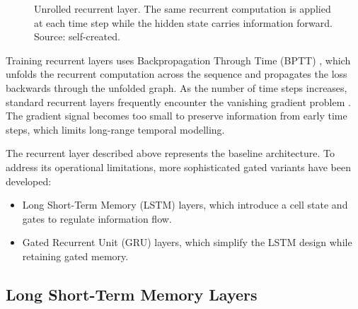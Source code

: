 \begin{figure}[H]
    \centering
    \caption{Unrolled recurrent layer. The same recurrent computation is applied at each time step while the hidden state carries information forward. Source: self-created.}
    \label{fig:rnn_unrolled}
\end{figure}

Training recurrent layers uses Backpropagation Through Time (BPTT) \cite{werbos1990bptt}, which
unfolds the recurrent computation across the sequence and propagates the loss backwards through the
unfolded graph. As the number of time steps increases, standard recurrent layers frequently
encounter the vanishing gradient problem \cite{bengio1994longterm}. The gradient signal becomes too
small to preserve information from early time steps, which limits long-range temporal modelling.

The recurrent layer described above represents the baseline architecture. To address its
operational limitations, more sophisticated gated variants have been developed:
\begin{itemize}
    \item Long Short-Term Memory (LSTM) layers, which introduce a cell state and gates to regulate
          information flow.
    \item Gated Recurrent Unit (GRU) layers, which simplify the LSTM design while retaining gated
          memory.
\end{itemize}

\subsection{Long Short-Term Memory Layers}

